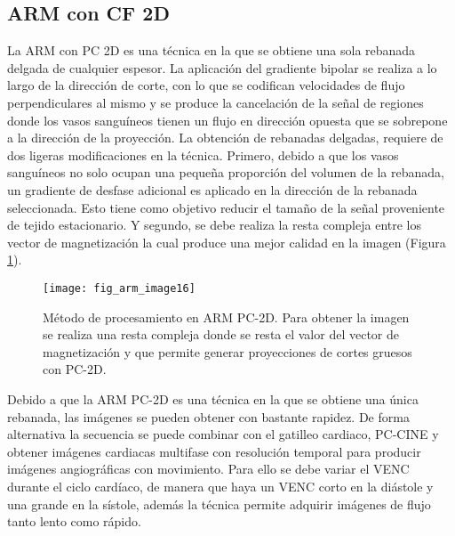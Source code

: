\subsection{ARM con CF 2D}
La ARM con PC 2D es una técnica en la que se obtiene una sola rebanada delgada de cualquier espesor. La aplicación del gradiente bipolar se realiza a lo largo de la dirección de corte, con lo que se codifican velocidades de flujo perpendiculares al mismo y se produce la cancelación de la señal de regiones donde los vasos sanguíneos tienen un flujo en dirección opuesta que se sobrepone a la dirección de la proyección. La obtención de rebanadas delgadas, requiere de dos ligeras modificaciones en la técnica. Primero, debido a que los vasos sanguíneos no solo ocupan una pequeña proporción del volumen de la rebanada, un gradiente de desfase adicional es aplicado en la dirección de la rebanada seleccionada. Esto tiene como objetivo reducir el tamaño de la señal proveniente de tejido estacionario. Y segundo, se debe realiza la resta compleja entre los vector de magnetización la cual produce una mejor calidad en la imagen (Figura \ref{fig:arm_image16}). 


\begin{figure}[htbp]
\begin{figg}
 \texttt{[image: fig\_arm\_image16]}
 \caption{
Método de procesamiento en ARM PC-2D. Para obtener la imagen se realiza una resta compleja donde se resta el valor del vector de magnetización y que permite generar proyecciones de cortes gruesos con PC-2D.
 }
 \label{fig:arm_image16}
\end{figg}
\end{figure}


 

Debido a que la ARM PC-2D es una técnica en la que se obtiene una única rebanada, las imágenes se pueden obtener con bastante rapidez. De forma alternativa la secuencia se puede combinar con el gatilleo cardiaco, PC-CINE y obtener imágenes cardiacas multifase con resolución temporal para producir imágenes angiográficas con movimiento. Para ello se debe variar el VENC durante el ciclo cardíaco, de manera que haya un VENC corto en la diástole y una grande en la sístole, además la técnica permite adquirir imágenes de flujo tanto lento como rápido. 

